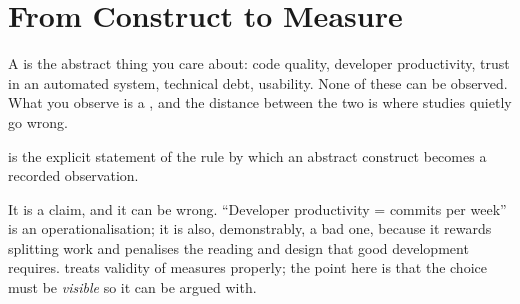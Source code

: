 \section{From Construct to Measure}

A  is the abstract thing you care about: code quality,
developer productivity, trust in an automated system, technical debt, usability.
None of these can be observed. What you observe is a , and the
distance between the two is where studies quietly go wrong.

\begin{definitionbox}[Operationalisation]
 is the explicit statement of the rule by which an
abstract construct becomes a recorded observation.

\medskip
It is a claim, and it can be wrong. ``Developer productivity = commits per
week'' is an operationalisation; it is also, demonstrably, a bad one, because
it rewards splitting work and penalises the reading and design that good
development requires.  treats validity of measures
properly; the point here is that the choice must be \emph{visible} so it can be
argued with.
\end{definitionbox}

